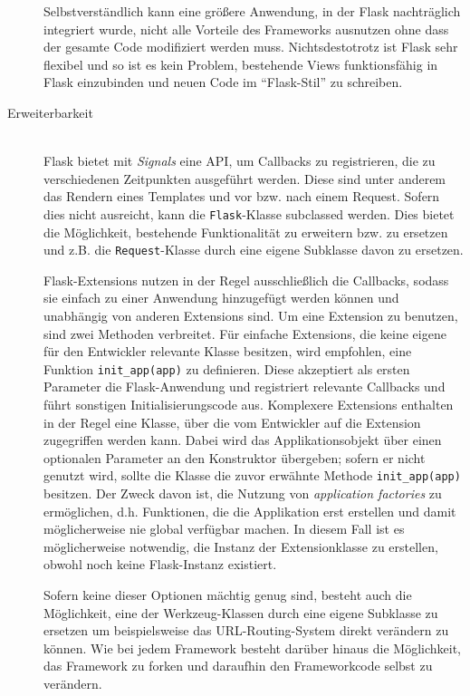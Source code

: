 \begin{description}
Selbstverständlich kann eine größere Anwendung, in der Flask nachträglich integriert wurde, nicht
alle Vorteile des Frameworks ausnutzen ohne dass der gesamte Code modifiziert werden muss.
Nichtsdestotrotz ist Flask sehr flexibel und so ist es kein Problem, bestehende Views funktionsfähig
in Flask einzubinden und neuen Code im \enquote{Flask-Stil} zu schreiben.


\item[Erweiterbarkeit] \hfill \\
Flask bietet mit \emph{Signals} eine API, um Callbacks zu registrieren, die zu verschiedenen
Zeitpunkten ausgeführt werden. Diese sind unter anderem das Rendern eines Templates und vor bzw.
nach einem Request. Sofern dies nicht ausreicht, kann die \lstinline{Flask}-Klasse subclassed
werden. Dies bietet die Möglichkeit, bestehende Funktionalität zu erweitern bzw. zu ersetzen und
z.B. die \lstinline{Request}-Klasse durch eine eigene Subklasse davon zu ersetzen.

Flask-Extensions nutzen in der Regel ausschließlich die Callbacks, sodass sie einfach zu einer
Anwendung hinzugefügt werden können und unabhängig von anderen Extensions sind. Um eine Extension zu
benutzen, sind zwei Methoden verbreitet. Für einfache Extensions, die keine eigene für den
Entwickler relevante Klasse besitzen, wird empfohlen, eine Funktion \lstinline{init_app(app)} zu
definieren. Diese akzeptiert als ersten Parameter die Flask-Anwendung und registriert relevante
Callbacks und führt sonstigen Initialisierungscode aus. Komplexere Extensions enthalten in der Regel
eine Klasse, über die vom Entwickler auf die Extension zugegriffen werden kann. Dabei wird das
Applikationsobjekt über einen optionalen Parameter an den Konstruktor übergeben; sofern er nicht
genutzt wird, sollte die Klasse die zuvor erwähnte Methode \lstinline{init_app(app)} besitzen. Der
Zweck davon ist, die Nutzung von \emph{application factories} zu ermöglichen, d.h. Funktionen, die
die Applikation erst erstellen und damit möglicherweise nie global verfügbar machen. In diesem Fall
ist es möglicherweise notwendig, die Instanz der Extensionklasse zu erstellen, obwohl noch keine
Flask-Instanz existiert.

Sofern keine dieser Optionen mächtig genug sind, besteht auch die Möglichkeit, eine der
Werkzeug-Klassen durch eine eigene Subklasse zu ersetzen um beispielsweise das URL-Routing-System
direkt verändern zu können. Wie bei jedem Framework besteht darüber hinaus die Möglichkeit, das
Framework zu forken und daraufhin den Frameworkcode selbst zu verändern.



\end{description}
